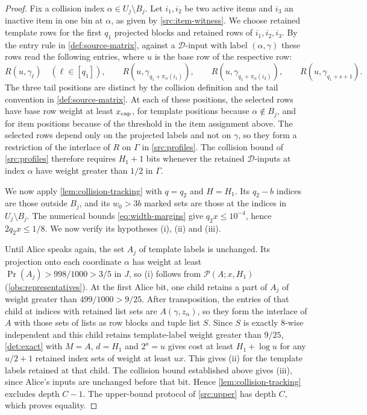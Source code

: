 \documentclass[11pt,letterpaper]{article} \usepackage[utf8]{inputenc}
\theoremstyle{plain} \newtheorem{theorem}{Theorem}[section]
\theoremstyle{definition} \newaliascnt{definition}{theorem}
\newcommand{\RP}[3]{\mathcal{P}(#1;#2,#3)}
\begin{document}
\begin{proof}
Fix a collision index \(\alpha\in U_j\setminus B_j\). Let
\(i_1,i_2\) be two active items and \(i_3\) an inactive item in one bin at
\(\alpha\), as given by \cref{src:item-witness}. We choose retained template
rows for the first \(q_1\) projected blocks and retained rows of \(i_1,i_2,i_3\).
By the entry rule in \cref{def:source-matrix}, against a
$\mathcal D$-input with label \((\alpha,\gamma)\) these rows read the
following entries, where \(u\) is the base row of the respective row:
\[
R(u,\gamma_\ell)\quad(\ell\in[q_1]),\qquad
R(u,\gamma_{q_1+\pi_\alpha(i_1)}),\qquad
R(u,\gamma_{q_1+\pi_\alpha(i_2)}),\qquad R(u,\gamma_{q_1+s+1}).
\]
The three tail positions are distinct by the collision definition and the tail
convention in \cref{def:source-matrix}. At each of these positions, the selected rows have base row weight at
least \(x_{\rm cap}\), for template positions because \(\alpha\notin B_j\), and for
item positions because of the threshold in the item assignment above. The selected rows depend only on the
projected labels and not on \(\gamma\), so they form a restriction of the
interlace of \(R\) on \(\Gamma\) in \cref{src:profiles}. The collision bound of
\cref{src:profiles} therefore requires \(H_1+1\) bits whenever the retained
$\mathcal D$-inputs at index \(\alpha\) have weight greater than \(1/2\) in \(\Gamma\).

We now apply \cref{lem:collision-tracking} with $q=q_2$ and $H=H_1$.
Its $q_2-b$ indices are those outside $B_j$, and its $w_0>3b$ marked sets are
those at the indices in $U_j\setminus B_j$. The numerical bounds
\eqref{eq:width-margins} give $q_2x\le10^{-4}$, hence $2q_2x\le1/8$.
We now verify its hypotheses (i), (ii) and (iii).

Until Alice speaks again, the set $A_j$ of template labels is unchanged. Its projection onto
each coordinate $\alpha$ has weight at least $\Pr(A_j)>998/1000>3/5$ in $J$, so (i)
follows from $\RP{A}{x}{H_1}$ (\cref{obs:representatives}).
At the first Alice bit, one child retains a part of $A_j$ of weight greater than
$499/1000>9/25$. After transposition, the entries of that child at indices with
retained list sets are $A(\gamma,z_\alpha)$, so they form the interlace of $A$ with
those sets of lists as row blocks and tuple list $S$. Since $S$ is exactly
$8$-wise independent and this child retains template-label weight greater
than $9/25$, \cref{det:exact} with $M=A$, $d=H_1$ and $2^a=u$ gives cost at
least $H_1+\log u$ for any $u/2+1$ retained index sets of weight at least
$ux$. This gives (ii) for the template labels retained at that child. The collision bound
established above gives (iii), since Alice's inputs are unchanged before that bit. Hence
\cref{lem:collision-tracking} excludes depth $C-1$.
The upper-bound protocol of \cref{src:upper} has depth $C$, which proves
equality.
\end{proof}
\end{document}
